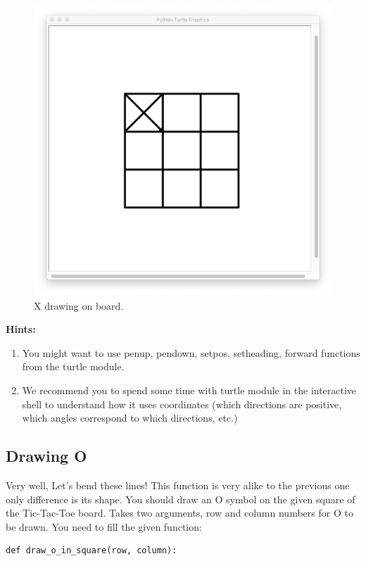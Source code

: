 \documentclass[a4paper]{article}
\begin{document}
\begin{figure}[!htb]
\centering
\includegraphics[width=1\textwidth]{x_drawing.png}
\caption{X drawing on board.}\label{fig:outputs}
\end{figure}

\textbf{Hints:}
\begin{enumerate}
\item You might want to use penup, pendown, setpos, setheading, forward functions from the turtle module.
\item We recommend you to spend some time with turtle module in the interactive shell to understand how it uses coordinates (which directions are positive, which angles correspond to which directions, etc.)
\end{enumerate}

\newpage
\subsection{Drawing O}
Very well, Let's bend these lines! This function is very alike to the previous one only difference is its shape. You should draw an O symbol on the given square of the Tic-Tac-Toe board. Takes two arguments, row and column numbers for O to be drawn. You need to fill the given function:

\begin{lstlisting} 
def draw_o_in_square(row, column):
\end{lstlisting}
\end{document}
